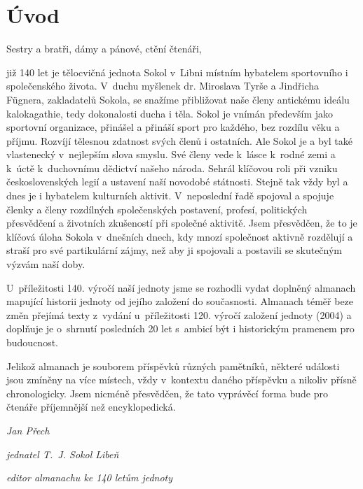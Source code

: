 \documentclass[a5paper, 12pt, twoside]{article}
\begin{document}
\clearpage


\setlength{\parskip}{0pt}

\section{Úvod}

Sestry a bratři, dámy a pánové, ctění čtenáři,

\noindent již 140 let je tělocvičná jednota Sokol v~Libni místním hybatelem sportovního i společenského života. V~duchu myšlenek dr. Miroslava Tyrše a Jindřicha Fügnera, zakladatelů Sokola, se snažíme přibližovat naše členy antickému ideálu kalokagathie, tedy dokonalosti ducha i těla. Sokol je vnímán především jako sportovní organizace, přinášel a přináší sport pro každého, bez rozdílu věku a příjmu. Rozvíjí tělesnou zdatnost svých členů i ostatních. Ale Sokol je a byl také vlastenecký v~nejlepším slova smyslu. Své členy vede k~lásce k~rodné zemi a k~úctě k~duchovnímu dědictví našeho národa. Sehrál klíčovou roli při vzniku československých legií a ustavení naší novodobé státnosti. Stejně tak vždy byl a dnes je i hybatelem kulturních aktivit. V~neposlední řadě spojoval a spojuje členky a členy rozdílných společenských postavení, profesí, politických přesvědčení a životních zkušeností při společné aktivitě. Jsem přesvědčen, že to je klíčová úloha Sokola v~dnešních dnech, kdy mnozí společnost aktivně rozdělují a straší pro své partikulární zájmy, než aby ji spojovali a postavili se skutečným výzvám naší doby. 

U~příležitosti 140. výročí naší jednoty jsme se rozhodli vydat doplněný almanach mapující historii jednoty od jejího založení do současnosti. Almanach téměř beze změn přejímá texty z~vydání u~příležitosti 120. výročí založení jednoty (2004) a doplňuje je o~shrnutí posledních 20 let s~ambicí být i historickým pramenem pro budoucnost. 

Jelikož almanach je souborem příspěvků různých pamětníků, některé události jsou zmíněny na více místech, vždy v~kontextu daného příspěvku a nikoliv přísně chronologicky. Jsem nicméně přesvědčen, že tato vyprávěcí forma bude pro čtenáře příjemnější než encyklopedická. 

\vspace{\baselineskip}
\hfill\textit{Jan Přech}

\hfill\textit{jednatel T.~J. Sokol Libeň}

\hfill\textit{editor almanachu ke 140 letům jednoty}
\end{document}
